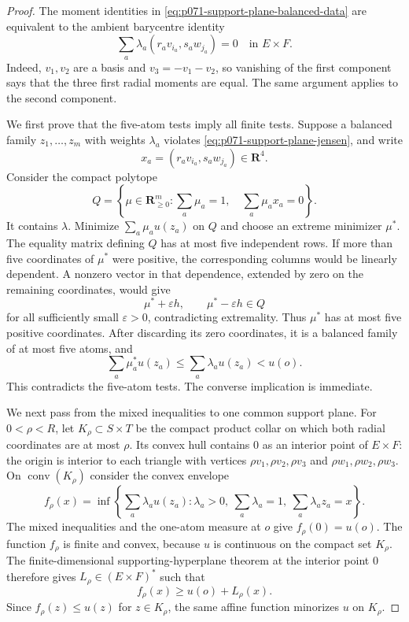 \begin{proof}
The moment identities in
\eqref{eq:p071-support-plane-balanced-data} are equivalent to the ambient
barycentre identity
\[
                  \sum_a\lambda_a(r_av_{i_a},s_aw_{j_a})=0
                  \quad\text{in }E\times F.
\]
Indeed, $v_1,v_2$ are a basis and $v_3=-v_1-v_2$, so vanishing of the first
component says that the three first radial moments are equal.  The same
argument applies to the second component.

We first prove that the five-atom tests imply all finite tests.  Suppose a
balanced family $z_1,\ldots,z_m$ with weights $\lambda_a$ violates
\eqref{eq:p071-support-plane-jensen}, and write
\[
                         x_a=(r_av_{i_a},s_aw_{j_a})\in\mathbf R^4.
\]
Consider the compact polytope
\[
 Q=\left\{\mu\in\mathbf R_{\geq0}^m:
        \sum_a\mu_a=1,\quad \sum_a\mu_ax_a=0\right\}.
\]
It contains $\lambda$.  Minimize
$\sum_a\mu_au(z_a)$ on $Q$ and choose an extreme minimizer $\mu^*$.
The equality matrix defining $Q$ has at most five independent rows.  If
more than five coordinates of $\mu^*$ were positive, the corresponding
columns would be linearly dependent.  A nonzero vector in that dependence,
extended by zero on the remaining coordinates, would give
\[
                         \mu^*+\varepsilon h,\qquad
                         \mu^*-\varepsilon h\in Q
\]
for all sufficiently small $\varepsilon>0$, contradicting extremality.
Thus $\mu^*$ has at most five positive coordinates.  After discarding its
zero coordinates, it is a balanced family of at most five atoms, and
\[
 \sum_a\mu_a^*u(z_a)
 \leq\sum_a\lambda_au(z_a)<u(o).
\]
This contradicts the five-atom tests.  The converse implication is
immediate.

We next pass from the mixed inequalities to one common support plane.  For
$0<\rho<R$, let $K_\rho\subset S\times T$ be the compact product collar
on which both radial coordinates are at most $\rho$.  Its convex hull
contains $0$ as an interior point of $E\times F$: the origin is interior
to each triangle with vertices $\rho v_1,\rho v_2,\rho v_3$ and
$\rho w_1,\rho w_2,\rho w_3$.  On $\operatorname{conv}(K_\rho)$
consider the convex envelope
\[
 f_\rho(x)=
 \inf\left\{
   \sum_a\lambda_au(z_a):
   \lambda_a>0,\ \sum_a\lambda_a=1,\ \sum_a\lambda_az_a=x
 \right\}.
\]
The mixed inequalities and the one-atom measure at $o$ give
$f_\rho(0)=u(o)$.  The function $f_\rho$ is finite and convex, because
$u$ is continuous on the compact set $K_\rho$.  The finite-dimensional
supporting-hyperplane theorem at the interior point $0$ therefore gives
$L_\rho\in(E\times F)^*$ such that
\[
                         f_\rho(x)\geq u(o)+L_\rho(x).
\]
Since $f_\rho(z)\leq u(z)$ for $z\in K_\rho$, the same affine function
minorizes $u$ on $K_\rho$.


\end{proof}
